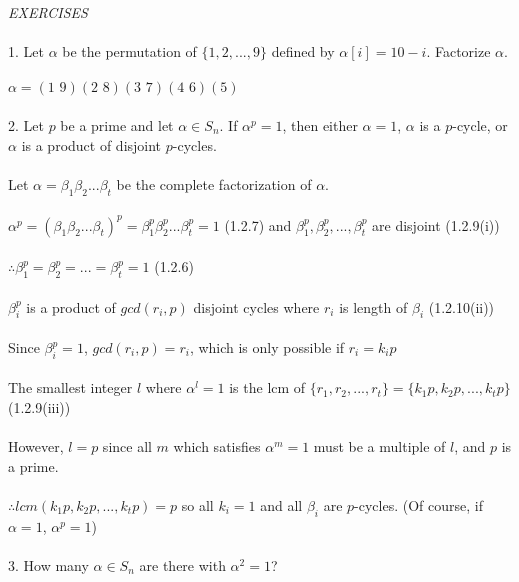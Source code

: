 \documentclass{article}
\begin{document}
\begin{siderules}\color{blue}
\textit{EXERCISES}\\\\
1. Let \(\alpha\) be the permutation of \(\{1,2,...,9\}\) defined by \(\alpha[i]=10-i\). Factorize \(\alpha\).\\\\\color{black}
\null\qquad\(\alpha=(1\,\,9)(2\,\,8)(3\,\,7)(4\,\,6)(5)\)\\\\
\color{blue}2. Let \(p\) be a prime and let \(\alpha\in S_n\). If \(\alpha^p=1\), then either \(\alpha=1\), \(\alpha\) is a \(p\)-cycle, or \(\alpha\) is a product of disjoint \(p\)-cycles.\\\\\color{black}
\null\qquad Let \(\alpha=\beta_1\beta_2...\beta_t\) be the complete factorization of \(\alpha\).\\\\
\null\qquad \(\alpha^p=(\beta_1\beta_2...\beta_t)^p=\beta_1^p\beta_2^p...\beta_t^p=1\) \color{gray}(1.2.7) \color{black}and \(\beta_1^p,\beta_2^p,...,\beta_t^p\) are disjoint \color{gray}(1.2.9(i)) \color{black}\\\\ \null\qquad\(\therefore\beta_1^p=\beta_2^p=...=\beta_t^p=1\) \color{gray}(1.2.6) \color{black}\\\\
\null\qquad\(\beta_i^p\) is a product of \(gcd(r_i,p)\) disjoint cycles where \(r_i\) is length of \(\beta_i\) \color{gray}(1.2.10(ii)) \color{black}\\\\
\null\qquad Since \(\beta_i^p=1\), \(gcd(r_i,p)=r_i\), which is only possible if \(r_i=k_ip\)\\\\
\null\qquad The smallest integer \(l\) where \(\alpha^l=1\) is the lcm of \(\{r_1,r_2,...,r_t\}=\{k_1p,k_2p,...,k_tp\}\) \color{gray}(1.2.9(iii))\color{black}\\\\
\null\qquad However, \(l=p\) since all \(m\) which satisfies \(\alpha^m=1\) must be a multiple of \(l\), and \(p\) is a prime.\\\\
\null\qquad\(\therefore lcm(k_1p,k_2p,...,k_tp)=p\) so all \(k_i=1\) and all \(\beta_i\) are \(p\)-cycles. (Of course, if \(\alpha=1\), \(\alpha^p=1\))\\\\
\color{blue}3. How many \(\alpha\in S_n\) are there with \(\alpha^2=1\)?\\\\\color{black}

\end{siderules}
\end{document}
